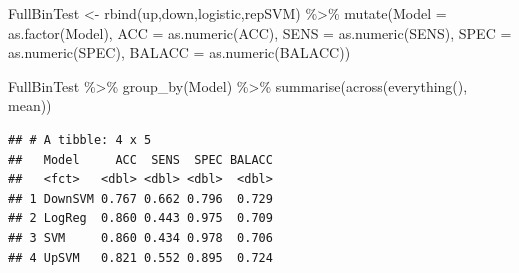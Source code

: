 \documentclass[
]{article}
\newenvironment{Shaded}{\begin{snugshade}}{\end{snugshade}}
\newcommand{\AttributeTok}[1]{\textcolor[rgb]{0.77,0.63,0.00}{#1}}
\newcommand{\FunctionTok}[1]{\textcolor[rgb]{0.00,0.00,0.00}{#1}}
\newcommand{\NormalTok}[1]{#1}
\newcommand{\OtherTok}[1]{\textcolor[rgb]{0.56,0.35,0.01}{#1}}
\newcommand{\SpecialCharTok}[1]{\textcolor[rgb]{0.00,0.00,0.00}{#1}}
\begin{document}
\begin{Shaded}
\begin{Highlighting}[]
\NormalTok{FullBinTest }\OtherTok{\textless{}{-}} \FunctionTok{rbind}\NormalTok{(up,down,logistic,repSVM) }\SpecialCharTok{\%\textgreater{}\%}  \FunctionTok{mutate}\NormalTok{(}\AttributeTok{Model =} \FunctionTok{as.factor}\NormalTok{(Model), }
                                                          \AttributeTok{ACC =} \FunctionTok{as.numeric}\NormalTok{(ACC), }
                                                          \AttributeTok{SENS =} \FunctionTok{as.numeric}\NormalTok{(SENS), }
                                                          \AttributeTok{SPEC =} \FunctionTok{as.numeric}\NormalTok{(SPEC), }
                                                          \AttributeTok{BALACC =} \FunctionTok{as.numeric}\NormalTok{(BALACC))}

\NormalTok{FullBinTest }\SpecialCharTok{\%\textgreater{}\%} \FunctionTok{group\_by}\NormalTok{(Model) }\SpecialCharTok{\%\textgreater{}\%} \FunctionTok{summarise}\NormalTok{(}\FunctionTok{across}\NormalTok{(}\FunctionTok{everything}\NormalTok{(), mean))}
\end{Highlighting}
\end{Shaded}

\begin{verbatim}
## # A tibble: 4 x 5
##   Model     ACC  SENS  SPEC BALACC
##   <fct>   <dbl> <dbl> <dbl>  <dbl>
## 1 DownSVM 0.767 0.662 0.796  0.729
## 2 LogReg  0.860 0.443 0.975  0.709
## 3 SVM     0.860 0.434 0.978  0.706
## 4 UpSVM   0.821 0.552 0.895  0.724
\end{verbatim}
\end{document}

